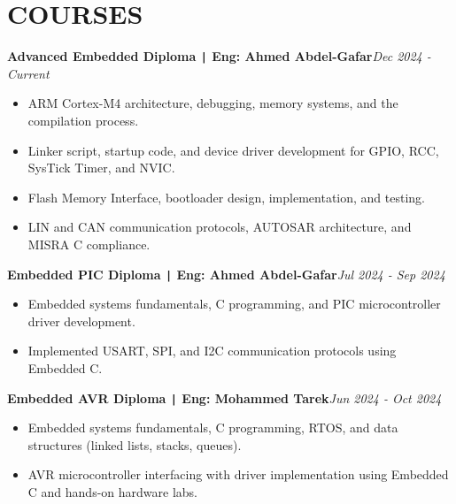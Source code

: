 \documentclass[11pt,a4paper]{article}
\begin{document}
\section*{\fontsize{14}{18}\textbf\selectfont COURSES}
\vspace{-0.3cm}
\begin{flushleft}
\textbf{Advanced Embedded Diploma \texttt{|} Eng: Ahmed Abdel-Gafar}\hfill\textit{Dec 2024 - Current}\\
\end{flushleft}
\vspace{-0.7cm}
\begin{itemize}
\item \setlength{\itemsep}{-0.0em} ARM Cortex-M4 architecture, debugging, memory systems, and the compilation process.
\item \setlength{\itemsep}{-0.0em} Linker script, startup code, and device driver development for GPIO, RCC, SysTick Timer, and NVIC.
\item \setlength{\itemsep}{-0.0em} Flash Memory Interface, bootloader design, implementation, and testing.
\item \setlength{\itemsep}{-0.0em} LIN and CAN communication protocols, AUTOSAR architecture, and MISRA C compliance.
\end{itemize}
\vspace{-0.5cm}
\begin{flushleft}
\textbf{Embedded PIC Diploma \texttt{|} Eng: Ahmed Abdel-Gafar}\hfill\textit{Jul 2024 - Sep 2024}\\
\end{flushleft}
\vspace{-0.7cm}
\begin{itemize}
\item \setlength{\itemsep}{-0.0em} Embedded systems fundamentals, C programming, and PIC microcontroller driver development.
\item \setlength{\itemsep}{-0.0em} Implemented USART, SPI, and I2C communication protocols using Embedded C.
\end{itemize}
\vspace{-0.5cm}
\begin{flushleft}
\textbf{Embedded AVR Diploma \texttt{|} Eng: Mohammed Tarek}\hfill\textit{Jun 2024 - Oct 2024}\\
\end{flushleft}
\vspace{-0.7cm}
\begin{itemize}
\item \setlength{\itemsep}{-0.0em} Embedded systems fundamentals, C programming, RTOS, and data structures (linked lists, stacks, queues).
\item \setlength{\itemsep}{-0.0em} AVR microcontroller interfacing with driver implementation using Embedded C and hands-on hardware labs.
\end{itemize}
\end{document}
